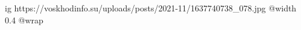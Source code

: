  
 
 
 
 

\ifcmt
  ig https://voskhodinfo.su/uploads/posts/2021-11/1637740738_078.jpg
  @width 0.4
  @wrap 
\fi
